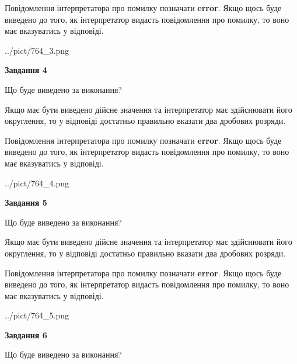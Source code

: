 \documentclass[12pt, ukrainian]{article}
\begin{document}
{\begin {Large}
Повідомлення інтерпретатора про помилку позначати \textbf{error}.
Якщо щось буде виведено до того, як інтерпретатор видасть повідомлення про помилку, 
то воно має вказуватись у відповіді. \par

\begin{center}
	{../pict/764_3.png}
\end{center}
\newpage

{\begin {center}\textbf{Завдання 4}\end {center}}\par
Що буде виведено за виконання? \par

Якщо має бути виведено дійсне значення та інтерпретатор має здійснювати його округлення, 
то у відповіді достатньо правильно вказати два дробових розряди.

Повідомлення інтерпретатора про помилку позначати \textbf{error}.
Якщо щось буде виведено до того, як інтерпретатор видасть повідомлення про помилку, 
то воно має вказуватись у відповіді. \par

\begin{center}
	{../pict/764_4.png}
\end{center}
\newpage

{\begin {center}\textbf{Завдання 5}\end {center}}\par
Що буде виведено за виконання? \par

Якщо має бути виведено дійсне значення та інтерпретатор має здійснювати його округлення, 
то у відповіді достатньо правильно вказати два дробових розряди.

Повідомлення інтерпретатора про помилку позначати \textbf{error}.
Якщо щось буде виведено до того, як інтерпретатор видасть повідомлення про помилку, 
то воно має вказуватись у відповіді. \par

\begin{center}
	{../pict/764_5.png}
\end{center}
\newpage

{\begin {center}\textbf{Завдання 6}\end {center}}\par
Що буде виведено за виконання? \par


\end{Large}}
\end{document}
